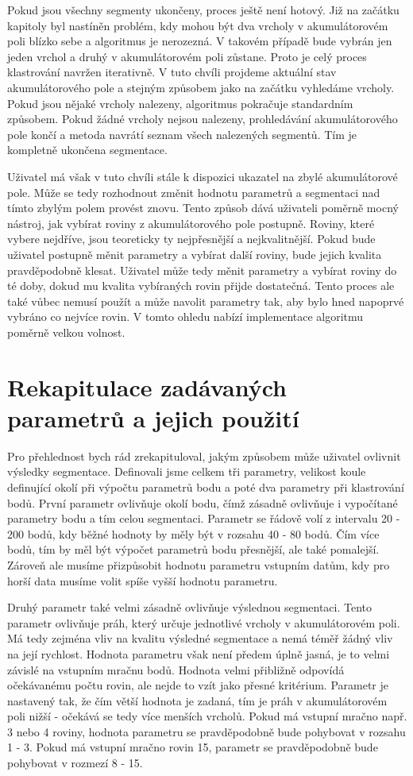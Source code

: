 \documentclass[11pt,twoside,a4paper]{book}
\begin{document}
Pokud jsou všechny segmenty ukončeny, proces ještě není hotový. Již na začátku kapitoly byl nastíněn problém, kdy mohou být dva vrcholy v akumulátorovém poli blízko sebe a algoritmus je nerozezná. V takovém případě bude vybrán jen jeden vrchol a druhý v akumulátorovém poli zůstane. Proto je celý proces klastrování navržen iterativně. V tuto chvíli projdeme aktuální stav akumulátorového pole a stejným způsobem jako na začátku vyhledáme vrcholy. Pokud jsou nějaké vrcholy nalezeny, algoritmus pokračuje standardním způsobem. Pokud žádné vrcholy nejsou nalezeny, prohledávání akumulátorového pole končí a metoda navrátí seznam všech nalezených segmentů. Tím je kompletně ukončena segmentace. 

Uživatel má však v tuto chvíli stále k dispozici ukazatel na zbylé akumulátorové pole. Může se tedy rozhodnout změnit hodnotu parametrů a segmentaci nad tímto zbylým polem provést znovu. Tento způsob dává uživateli poměrně mocný nástroj, jak vybírat roviny z akumulátorového pole postupně. Roviny, které vybere nejdříve, jsou teoreticky ty nejpřesnější a nejkvalitnější. Pokud bude uživatel postupně měnit parametry a vybírat další roviny, bude jejich kvalita pravděpodobně klesat. Uživatel může tedy měnit parametry a vybírat roviny do té doby, dokud mu kvalita vybíraných rovin přijde dostatečná. Tento proces ale také vůbec nemusí použít a může navolit parametry tak, aby bylo hned napoprvé vybráno co nejvíce rovin. V tomto ohledu nabízí implementace algoritmu poměrně velkou volnost.


\section{Rekapitulace zadávaných parametrů a jejich použití}
\label{sub:param}

Pro přehlednost bych rád zrekapituloval, jakým způsobem může uživatel ovlivnit výsledky segmentace. Definovali jsme celkem tři parametry, velikost koule definující okolí při výpočtu parametrů bodu a poté dva parametry při klastrování bodů. První parametr ovlivňuje okolí bodu, čímž zásadně ovlivňuje i vypočítané parametry bodu a tím celou segmentaci. Parametr se řádově volí z intervalu 20 - 200 bodů, kdy běžné hodnoty by měly být v rozsahu 40 - 80 bodů. Čím více bodů, tím by měl být výpočet parametrů bodu přesnější, ale také pomalejší. Zároveň ale musíme přizpůsobit hodnotu parametru vstupním datům, kdy pro horší data musíme volit spíše vyšší hodnotu parametru. 

Druhý parametr také velmi zásadně ovlivňuje výslednou segmentaci. Tento parametr ovlivňuje práh, který určuje jednotlivé vrcholy v akumulátorovém poli. Má tedy zejména vliv na kvalitu výsledné segmentace a nemá téměř žádný vliv na její rychlost. Hodnota parametru však není předem úplně jasná, je to velmi závislé na vstupním mračnu bodů. Hodnota velmi přibližně odpovídá očekávanému počtu rovin, ale nejde to vzít jako přesné kritérium. Parametr je nastavený tak, že čím větší hodnota je zadaná, tím je práh v akumulátorovém poli nižší - očekává se tedy více menších vrcholů. Pokud má vstupní mračno např. 3 nebo 4 roviny, hodnota parametru se pravděpodobně bude pohybovat v rozsahu 1 - 3. Pokud má vstupní mračno rovin 15, parametr se pravděpodobně bude pohybovat v rozmezí 8 - 15.
\end{document}
